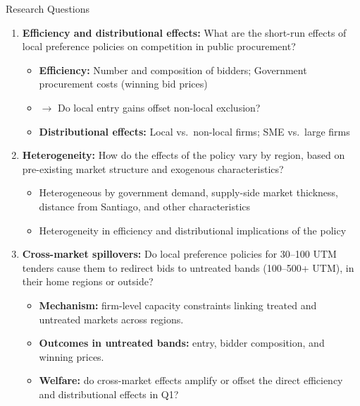 \documentclass[9pt,aspectratio=169]{beamer}
\begin{document}
\begin{frame}{Research Questions}
\begin{enumerate}
  \item[\textbf{Q1}] \textbf{Efficiency and distributional effects:} What are the short-run effects of local
        preference policies on competition in public procurement? 
        \begin{itemize}
          \item \textbf{Efficiency:} Number and composition of bidders; Government procurement costs (winning bid prices)
          \item[] $\to$ Do local entry gains offset non-local exclusion? 
          \item \textbf{Distributional effects:} Local vs.\ non-local firms; SME vs.\ large firms
        \end{itemize}

  \vspace{0.5em}
  \item[\textbf{Q2}] \textbf{Heterogeneity:} How do the effects of the policy vary by region, based on pre-existing market structure and exogenous characteristics?
        \begin{itemize}
          \item Heterogeneous by government demand, supply-side market thickness, distance from Santiago, and other characteristics
          \item Heterogeneity in efficiency and distributional implications of the policy
        \end{itemize}

  \vspace{0.5em}
\item[\textbf{Q3}] \textbf{Cross-market spillovers:} Do local preference policies for 30--100 UTM tenders cause them
      to redirect bids to untreated bands (100--500+ UTM), in their home
      regions or outside?
      \begin{itemize}
        \item \textbf{Mechanism:} firm-level capacity constraints linking
              treated and untreated markets across regions.
        \item \textbf{Outcomes in untreated bands:} entry, bidder composition, and winning prices.
        \item \textbf{Welfare:} do cross-market effects amplify or
              offset the direct efficiency and distributional effects in Q1?
      \end{itemize}
\end{enumerate}
\end{frame}
\end{document}
